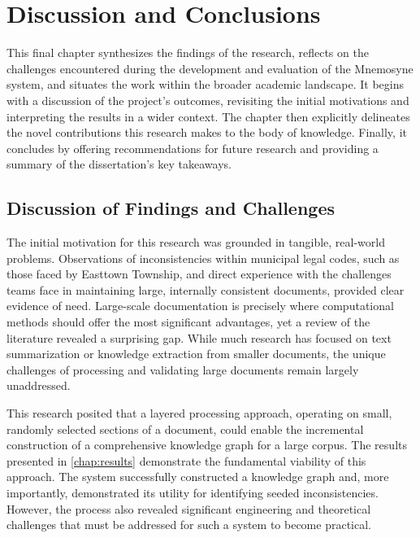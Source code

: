 \chapter{Discussion and Conclusions}
\label{chap:discussion}


This final chapter synthesizes the findings of the research, reflects on the challenges encountered during the development and evaluation of the Mnemosyne system, and situates the work within the broader academic landscape. It begins with a discussion of the project's outcomes, revisiting the initial motivations and interpreting the results in a wider context. The chapter then explicitly delineates the novel contributions this research makes to the body of knowledge. Finally, it concludes by offering recommendations for future research and providing a summary of the dissertation's key takeaways.

\section{Discussion of Findings and Challenges}
\label{sec:discussion}

The initial motivation for this research was grounded in tangible, real-world problems. Observations of inconsistencies within municipal legal codes, such as those faced by Easttown Township, and direct experience with the challenges teams face in maintaining large, internally consistent documents, provided clear evidence of need. Large-scale documentation is precisely where computational methods should offer the most significant advantages, yet a review of the literature revealed a surprising gap. While much research has focused on text summarization or knowledge extraction from smaller documents, the unique challenges of processing and validating large documents remain largely unaddressed.

This research posited that a layered processing approach, operating on small, randomly selected sections of a document, could enable the incremental construction of a comprehensive knowledge graph for a large corpus. The results presented in \cref{chap:results} demonstrate the fundamental viability of this approach. The system successfully constructed a knowledge graph and, more importantly, demonstrated its utility for identifying seeded inconsistencies. However, the process also revealed significant engineering and theoretical challenges that must be addressed for such a system to become practical.

